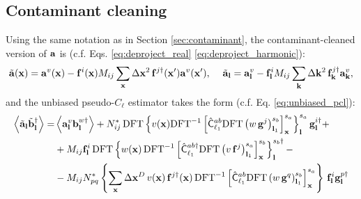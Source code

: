 \documentclass[a4paper,10pt]{article}
\begin{document}
  \subsection{Contaminant cleaning}
    Using the same notation as in Section \ref{sec:contaminant}, the contaminant-cleaned version of ${\bf a}$ is (c.f. Eqs. \ref{eq:deproject_real} \ref{eq:deproject_harmonic}):
    \begin{equation}
      \tilde{\bf a}({\bf x})={\bf a}^v({\bf x})-{\bf f}^i({\bf x})M_{ij}\sum_{\bf x}\Delta{\bf x}^2\,{\bf f}^{j\dag}({\bf x}'){\bf a}^v({\bf x}'),\hspace{12pt}
      \tilde{\bf a}_{\bf l}={\bf a}^v_{\bf l}-{\bf f}^i_{\bf l}M_{ij}\sum_{\bf k}\Delta{\bf k}^2\,{\bf f}^{j\dag}_{\bf k}{\bf a}^v_{\bf k},
    \end{equation}
    and the unbiased pseudo-$C_\ell$ estimator takes the form (c.f. Eq. \ref{eq:unbiased_pcl}):
    \begin{align}\nonumber
      \left\langle\tilde{\bf a}_{\bf l}\tilde{\bf b}_{\bf l}^\dag\right\rangle=&\left\langle{\bf a}^v_{\bf l}{\bf b}^{w\dag}_{\bf l}\right\rangle+N^*_{ij}\,{\rm DFT}\left\{v({\bf x}){\rm DFT}^{-1}\left[\hat{\sf C}^{ab}_{\ell_1}{\rm DFT}\left(w\,{\bf g}^j\right)^{s_b}_{{\bf l}_1}\right]^{s_a}_{\bf x}\right\}^{s_a}_{\bf l}{\bf g}^{i\dag}_{\bf l}+\\\nonumber
      &+M_{ij}{\bf f}^i_{\bf l}\,{\rm DFT}\left\{w({\bf x})\,{\rm DFT}^{-1}\left[\hat{\sf C}^{ab\dag}_{\ell_1}{\rm DFT}\left(v\,{\bf f}^j\right)^{s_a}_{{\bf l}_1}\right]^{s_b}_{\bf x}\right\}^{s_b\dag}_{\bf l}-\\
      &-M_{ij}N^*_{pq}\left\{\sum_{\bf x} \Delta{\bf x}^D\,v({\bf x})\,{\bf f}^{j\dag}({\bf x})\,{\rm DFT}^{-1}\left[\hat{\sf C}^{ab}_{\ell_1}{\rm DFT}\left(w\,{\bf g}^q\right)^{s_b}_{{\bf l}_1}\right]^{s_a}_{\bf x}\right\}\,{\bf f}^i_{\bf l}{\bf g}^{p\dag}_{\bf l}
    \end{align}
\end{document}
